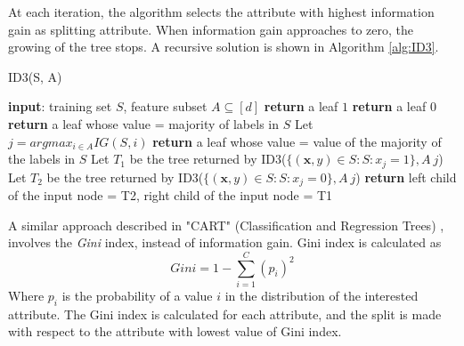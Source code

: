 At each iteration, the algorithm selects the attribute with highest information gain as splitting attribute. When information gain approaches to zero, the growing of the tree stops. A recursive solution is shown in Algorithm \ref{alg:ID3}.

\begin{algorithm}
	\caption{ID3(S, A)}
	\label{alg:ID3}
	\begin{algorithmic}[1]
		\State \textbf{input}: training set $S$, feature subset $A \subseteq [d]$
		\State
		\State \textbf{return} a leaf $1$
		\EndIf
		\State \textbf{return} a leaf $0$
		\EndIf
		\State \textbf{return} a leaf whose value = majority of labels in $S$
		\Else
		\State Let $j = argmax_{i \in A} IG(S, i)$
		\State \textbf{return} a leaf whose value = value of the majority of the labels in $S$
		\Else
		\State Let $T_1$ be the tree returned by ID3($\{(\mathbf{x}, y) \in S : S: x_j = 1\}, A \ {j}$)
		\State Let $T_2$ be the tree returned by ID3($\{(\mathbf{x}, y) \in S : S: x_j = 0\}, A \ {j}$)
		\State \textbf{return} left child of the input node = T2, 
		\State	\hspace*{3em} right child of the input node = T1
		\EndIf
		\EndIf

	\end{algorithmic}
\end{algorithm}

A similar approach described in "CART" (Classification and Regression Trees) \cite{cart84}, involves the \textit{Gini} index, instead of information gain. Gini index is calculated as 
\[ Gini = 1 - \sum_{i=1}^{C} (p_i)^2 \]
Where $p_i$ is the probability of a value $i$ in the distribution of the interested attribute. The Gini index is calculated for each attribute, and the split is made with respect to the attribute with lowest value of Gini index.


